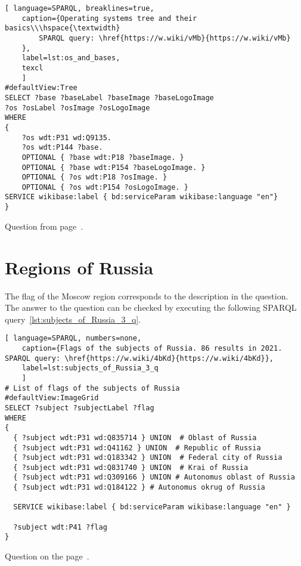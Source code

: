 \begin{lstlisting}[ language=SPARQL, breaklines=true, 
	caption={Operating systems tree and their basics\\\hspace{\textwidth}
		SPARQL query: \href{https://w.wiki/vMb}{https://w.wiki/vMb}
	},
	label=lst:os_and_bases,
	texcl 
	]
#defaultView:Tree
SELECT ?base ?baseLabel ?baseImage ?baseLogoImage
?os ?osLabel ?osImage ?osLogoImage
WHERE
{
	?os wdt:P31 wd:Q9135. 
	?os wdt:P144 ?base.
	OPTIONAL { ?base wdt:P18 ?baseImage. }
	OPTIONAL { ?base wdt:P154 ?baseLogoImage. }
	OPTIONAL { ?os wdt:P18 ?osImage. }
	OPTIONAL { ?os wdt:P154 ?osLogoImage. }
SERVICE wikibase:label { bd:serviceParam wikibase:language "en"}
}
\end{lstlisting}

Question from page~\pageref{tasks:operating_system_tasks}.

\section{Regions of Russia}
\begin{exercise}
	\label{answer:subjects_of_Russia_3}
	The flag of the Moscow region corresponds to the description in the question. The answer to the question can be checked by executing the following SPARQL query~\ref{lst:subjects_of_Russia_3_q}.
\end{exercise}	
	\begin{lstlisting}[ language=SPARQL, numbers=none,
	caption={Flags of the subjects of Russia. 86 results in 2021. SPARQL query: \href{https://w.wiki/4bKd}{https://w.wiki/4bKd}},
	label=lst:subjects_of_Russia_3_q
	]
# List of flags of the subjects of Russia
#defaultView:ImageGrid
SELECT ?subject ?subjectLabel ?flag
WHERE
{
  { ?subject wdt:P31 wd:Q835714 } UNION  # Oblast of Russia
  { ?subject wdt:P31 wd:Q41162 } UNION  # Republic of Russia
  { ?subject wdt:P31 wd:Q183342 } UNION  # Federal city of Russia
  { ?subject wdt:P31 wd:Q831740 } UNION  # Krai of Russia
  { ?subject wdt:P31 wd:Q309166 } UNION # Autonomus oblast of Russia
  { ?subject wdt:P31 wd:Q184122 } # Autonomus okrug of Russia
  
  SERVICE wikibase:label { bd:serviceParam wikibase:language "en" }
   
  ?subject wdt:P41 ?flag
}
\end{lstlisting}
	
\small{Question on the page~\pageref{lst:oblast-of-Russia}.}

